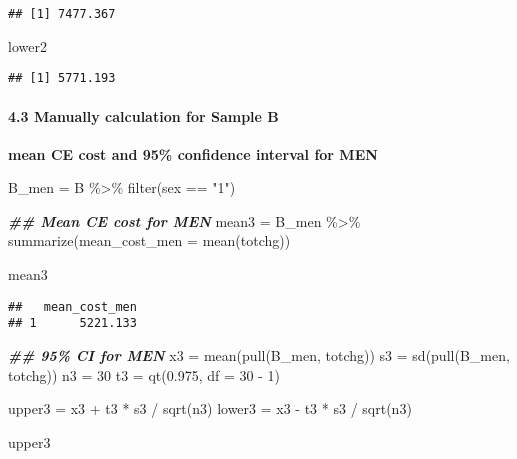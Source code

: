 \documentclass[
]{article}
\newenvironment{Shaded}{\begin{snugshade}}{\end{snugshade}}
\newcommand{\AttributeTok}[1]{\textcolor[rgb]{0.77,0.63,0.00}{#1}}
\newcommand{\DecValTok}[1]{\textcolor[rgb]{0.00,0.00,0.81}{#1}}
\newcommand{\DocumentationTok}[1]{\textcolor[rgb]{0.56,0.35,0.01}{\textbf{\textit{#1}}}}
\newcommand{\FloatTok}[1]{\textcolor[rgb]{0.00,0.00,0.81}{#1}}
\newcommand{\FunctionTok}[1]{\textcolor[rgb]{0.00,0.00,0.00}{#1}}
\newcommand{\NormalTok}[1]{#1}
\newcommand{\OtherTok}[1]{\textcolor[rgb]{0.56,0.35,0.01}{#1}}
\newcommand{\SpecialCharTok}[1]{\textcolor[rgb]{0.00,0.00,0.00}{#1}}
\newcommand{\StringTok}[1]{\textcolor[rgb]{0.31,0.60,0.02}{#1}}
\begin{document}
\begin{verbatim}
## [1] 7477.367
\end{verbatim}

\begin{Shaded}
\begin{Highlighting}[]
\NormalTok{lower2}
\end{Highlighting}
\end{Shaded}

\begin{verbatim}
## [1] 5771.193
\end{verbatim}

\hypertarget{manually-calculation-for-sample-b}{%
\paragraph{4.3 Manually calculation for Sample
B}\label{manually-calculation-for-sample-b}}

\textbf{mean CE cost and 95\% confidence interval for MEN}

\begin{Shaded}
\begin{Highlighting}[]
\NormalTok{B\_men }\OtherTok{=} 
\NormalTok{B }\SpecialCharTok{\%\textgreater{}\%} 
  \FunctionTok{filter}\NormalTok{(sex }\SpecialCharTok{==} \StringTok{"1"}\NormalTok{)}

\DocumentationTok{\#\# Mean CE cost for MEN}
\NormalTok{mean3 }\OtherTok{=} 
\NormalTok{B\_men }\SpecialCharTok{\%\textgreater{}\%} 
  \FunctionTok{summarize}\NormalTok{(}\AttributeTok{mean\_cost\_men =} \FunctionTok{mean}\NormalTok{(totchg)) }

\NormalTok{mean3}
\end{Highlighting}
\end{Shaded}

\begin{verbatim}
##   mean_cost_men
## 1      5221.133
\end{verbatim}

\begin{Shaded}
\begin{Highlighting}[]
\DocumentationTok{\#\# 95\% CI for MEN}
\NormalTok{x3 }\OtherTok{=} \FunctionTok{mean}\NormalTok{(}\FunctionTok{pull}\NormalTok{(B\_men, totchg))}
\NormalTok{s3 }\OtherTok{=} \FunctionTok{sd}\NormalTok{(}\FunctionTok{pull}\NormalTok{(B\_men, totchg))}
\NormalTok{n3 }\OtherTok{=} \DecValTok{30}
\NormalTok{t3 }\OtherTok{=} \FunctionTok{qt}\NormalTok{(}\FloatTok{0.975}\NormalTok{, }\AttributeTok{df =} \DecValTok{30} \SpecialCharTok{{-}} \DecValTok{1}\NormalTok{)}

\NormalTok{upper3 }\OtherTok{=}\NormalTok{ x3 }\SpecialCharTok{+}\NormalTok{ t3 }\SpecialCharTok{*}\NormalTok{ s3 }\SpecialCharTok{/} \FunctionTok{sqrt}\NormalTok{(n3)}
\NormalTok{lower3 }\OtherTok{=}\NormalTok{ x3 }\SpecialCharTok{{-}}\NormalTok{ t3 }\SpecialCharTok{*}\NormalTok{ s3 }\SpecialCharTok{/} \FunctionTok{sqrt}\NormalTok{(n3)}

\NormalTok{upper3}
\end{Highlighting}
\end{Shaded}
\end{document}
